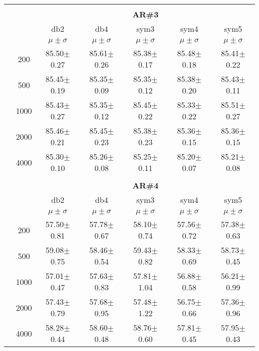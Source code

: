 \begin{table}[H]
\begin{tabular}{|c|c|c c c c c|}
\\ \midrule
\multicolumn{7}{c}{}\\ 



\cline{3-7}
\multicolumn{2}{c|}{\multirow{3}{*}{}} & \multicolumn{5}{c|}{\textbf{AR\#3}}   \\\cline{3-7} 
\multicolumn{2}{c|}{}  & db2 & db4 & sym3 & sym4 & sym5 \\\cline{3-7}%
\multicolumn{2}{c|}{}& $\mu \pm \sigma$ & $\mu \pm \sigma$ & $\mu \pm \sigma$ & $\mu \pm \sigma$ & $\mu \pm \sigma$ \\\hline

\multicolumn{1}{|c|}{ \multirow{5}{*}{\rotatebox[origin=c]{90}{\textbf{Neurônios}}} }
&200	&85.50$\pm$0.27	&85.61$\pm$0.26	&85.38$\pm$0.17	&85.48$\pm$0.18	&85.41$\pm$0.22\\\cline{2-7}
&500	&85.45$\pm$0.19	&85.35$\pm$0.09	&85.35$\pm$0.12	&85.38$\pm$0.20	&85.43$\pm$0.11\\\cline{2-7}
&1000	&85.43$\pm$0.27	&85.35$\pm$0.12	&85.45$\pm$0.22	&85.33$\pm$0.22	&85.51$\pm$0.27\\\cline{2-7}
&2000	&85.46$\pm$0.21	&85.45$\pm$0.23	&85.38$\pm$0.23	&85.36$\pm$0.15	&85.36$\pm$0.15\\\cline{2-7}
&4000	&85.30$\pm$0.10	&85.26$\pm$0.08 &85.25$\pm$0.11	&85.20$\pm$0.07	&85.21$\pm$0.08
	

\\ \midrule

\multicolumn{7}{c}{}\\ 



\cline{3-7}
\multicolumn{2}{c|}{\multirow{3}{*}{}} & \multicolumn{5}{c|}{\textbf{AR\#4}}   \\\cline{3-7} 
\multicolumn{2}{c|}{}  & db2 & db4 & sym3 & sym4 & sym5 \\\cline{3-7}%
\multicolumn{2}{c|}{}& $\mu \pm \sigma$ & $\mu \pm \sigma$ & $\mu \pm \sigma$ & $\mu \pm \sigma$ & $\mu \pm \sigma$ \\\hline
\multicolumn{1}{|c|}{ \multirow{5}{*}{\rotatebox[origin=c]{90}{\textbf{Neurônios}}} }
&200	&57.50$\pm$0.81	&57.78$\pm$0.67	&58.10$\pm$0.74	&57.56$\pm$0.72	&57.38$\pm$0.63\\\cline{2-7}
&500	&59.08$\pm$0.75	&58.46$\pm$0.54	&59.43$\pm$0.82	&58.33$\pm$0.69	&58.73$\pm$0.45\\\cline{2-7}
&1000	&57.01$\pm$0.47	&57.63$\pm$0.83	&57.81$\pm$1.04	&56.88$\pm$0.58	&56.21$\pm$0.99\\\cline{2-7}
&2000	&57.43$\pm$0.79	&57.68$\pm$0.95	&57.48$\pm$1.22	&56.75$\pm$0.66	&57.36$\pm$0.96\\\cline{2-7}
&4000	&58.28$\pm$0.44	&58.60$\pm$0.48	&58.76$\pm$0.60	&57.81$\pm$0.45 &57.95$\pm$0.43
	


\end{tabular}
\end{table}
